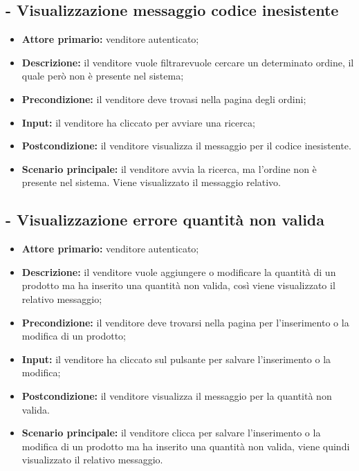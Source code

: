 \stepUserCase
\subsection{ - Visualizzazione messaggio codice inesistente}
\begin{itemize}
    \item \textbf{Attore primario:} venditore autenticato;
    \item \textbf{Descrizione:} il venditore vuole filtrarevuole cercare un determinato ordine, il quale però non è presente nel sistema;
    \item \textbf{Precondizione:} il venditore deve trovasi nella pagina degli ordini;
    \item \textbf{Input:} il venditore ha cliccato per avviare una ricerca;
    \item \textbf{Postcondizione:} il venditore visualizza il messaggio per il codice inesistente.
    \item \textbf{Scenario principale:} il venditore avvia la ricerca, ma l'ordine non è presente nel sistema. Viene visualizzato il messaggio relativo.
\end{itemize}

\stepUserCase
\subsection{ - Visualizzazione errore quantità non valida}
\begin{itemize}
    \item \textbf{Attore primario:} venditore autenticato;
    \item \textbf{Descrizione:} il venditore vuole aggiungere o modificare la quantità di un prodotto ma ha inserito una quantità non valida, così viene visualizzato il relativo messaggio;
    \item \textbf{Precondizione:} il venditore deve trovarsi nella pagina per l'inserimento o la modifica di un prodotto;
    \item \textbf{Input:} il venditore ha cliccato sul pulsante per salvare l'inserimento o la modifica;
    \item \textbf{Postcondizione:} il venditore visualizza il messaggio per la quantità non valida.
    \item \textbf{Scenario principale:} il venditore clicca per salvare l'inserimento o la modifica di un prodotto ma ha inserito una quantità non valida, viene quindi visualizzato il relativo messaggio.
\end{itemize}